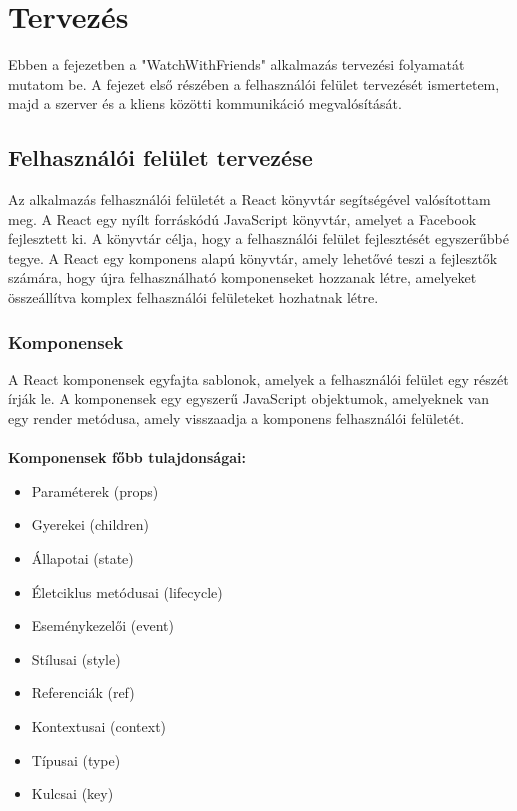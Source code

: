 \chapter{Tervez\'es}\label{chapter:tervezes}
Ebben a fejezetben a "WatchWithFriends" alkalmazás tervezési folyamatát mutatom be.
A fejezet első részében a felhasználói felület tervezését ismertetem,
majd a szerver és a kliens közötti kommunikáció megvalósítását.
\section{Felhasználói felület tervezése}
Az alkalmazás felhasználói felületét a React könyvtár segítségével valósítottam meg.
A React egy nyílt forráskódú JavaScript könyvtár, amelyet a Facebook fejlesztett ki.
A könyvtár célja, hogy a felhasználói felület fejlesztését egyszerűbbé tegye.
A React egy komponens alapú könyvtár, amely lehetővé teszi a fejlesztők számára,
hogy újra felhasználható komponenseket hozzanak létre, amelyeket összeállítva
komplex felhasználói felületeket hozhatnak létre.
\subsection*{Komponensek}
A React komponensek egyfajta sablonok, amelyek a felhasználói felület egy részét írják le.
A komponensek egy egyszerű JavaScript objektumok, amelyeknek van egy render metódusa,
amely visszaadja a komponens felhasználói felületét.
\\
\\
\textbf{Komponensek főbb tulajdonságai:}
\begin{itemize}
    \item Paraméterek (props)
    \item Gyerekei (children)
    \item Állapotai (state)
    \item Életciklus metódusai (lifecycle)
    \item Eseménykezelői (event)
    \item Stílusai (style)
    \item Referenciák (ref)
    \item Kontextusai (context)
    \item Típusai (type)
    \item Kulcsai (key)
\end{itemize}
